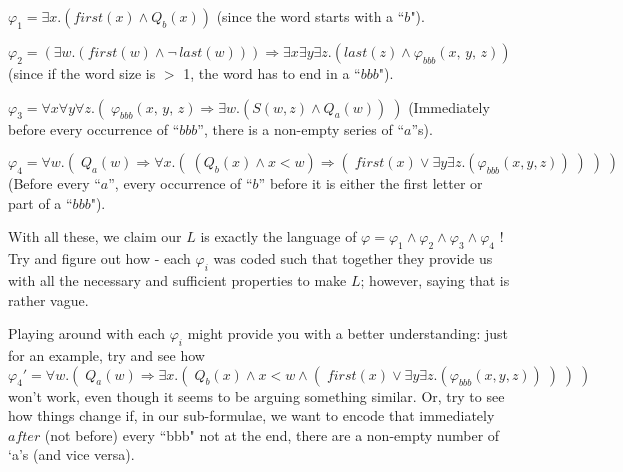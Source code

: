 \documentclass{article}
\begin{document}
\begin{flushleft}
$\varphi_1 = \exists x.(first(x) \land Q_b(x))$ (since the word starts with a ``$b$").

$\varphi_2 = (\exists w.(first(w) \land \neg\, last(w))) \Rightarrow \exists x \exists y \exists z.(last(z) \land \varphi_{bbb}(x,\, y,\, z))$ (since if the word size is $>$ 1, the word has to end in a ``$bbb$").

$\varphi_3 = \forall x \forall y \forall z.(\;\varphi_{bbb}(x,\, y,\, z) \Rightarrow \exists w.(S(w, z) \land Q_a(w))\;)$ (Immediately before every occurrence of ``$bbb$'', there is a non-empty series of ``$a$''s).

$\varphi_4 = \forall w.(\; Q_a(w) \Rightarrow \forall x.(\;(Q_b(x) \land x < w) \Rightarrow (\; first(x) \lor \exists y \exists z.(\varphi_{bbb}(x, y, z))\;) \;)\;)$ (Before every ``$a$'', every occurrence of ``$b$'' before it is either the first letter or part of a ``$bbb$").

With all these, we claim our $L$ is exactly the language of $\varphi = \varphi_1 \land \varphi_2 \land \varphi_3 \land \varphi_4$ ! Try and figure out how - each $\varphi_i$ was coded such that together they provide us with all the necessary and sufficient properties to make $L$; however, saying that is rather vague.

Playing around with each $\varphi_i$ might provide you with a better understanding: just for an example, try and see how $\varphi_4' = \forall w.(\; Q_a(w) \Rightarrow \exists x.(\;Q_b(x) \land x < w \land (\; first(x) \lor \exists y \exists z.(\varphi_{bbb}(x, y, z))\;) \;)\;)$ won't work, even though it seems to be arguing something similar. Or, try to see how things change if, in our sub-formulae, we want to encode that immediately $after$ (not before) every ``bbb" not at the end, there are a non-empty number of `a's (and vice versa).
\end{flushleft}
\end{document}
